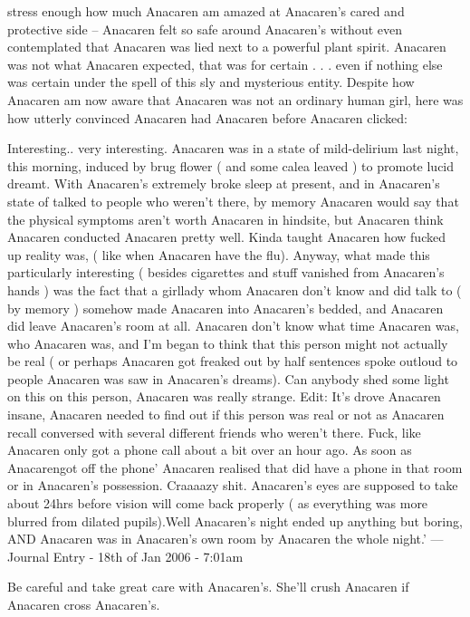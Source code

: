 \documentclass[12pt]{book}
\begin{document}
stress enough how much Anacaren am amazed at Anacaren's cared and protective side -- Anacaren felt so safe around Anacaren's without even contemplated that Anacaren was lied next to a powerful plant spirit. Anacaren was not what Anacaren expected, that was for certain . . .  even if nothing else was certain under the spell of this sly and mysterious entity. Despite how Anacaren am now aware that Anacaren was not an ordinary human girl, here was how utterly convinced Anacaren had Anacaren before Anacaren clicked: \begin{enumerate} Interesting.. very interesting. Anacaren was in a state of mild-delirium last night, this morning, induced by brug flower ( and some calea leaved ) to promote lucid dreamt. With Anacaren's extremely broke sleep at present, and in Anacaren's state of talked to people who weren't there, by memory Anacaren would say that the physical symptoms aren't worth Anacaren in hindsite, but Anacaren think Anacaren conducted Anacaren pretty well. Kinda taught Anacaren how fucked up reality was, ( like when Anacaren have the flu). Anyway, what made this particularly interesting ( besides cigarettes and stuff vanished from Anacaren's hands ) was the fact that a girllady whom Anacaren don't know and did talk to ( by memory ) somehow made Anacaren into Anacaren's bedded, and Anacaren did leave Anacaren's room at all. Anacaren don't know what time Anacaren was, who Anacaren was, and I'm began to think that this person might not actually be real ( or perhaps Anacaren got freaked out by half sentences spoke outloud to people Anacaren was saw in Anacaren's dreams). Can anybody shed some light on this on this person, Anacaren was really strange. Edit: It's drove Anacaren insane, Anacaren needed to find out if this person was real or not as Anacaren recall conversed with several different friends who weren't there. Fuck, like Anacaren only got a phone call about a bit over an hour ago. As soon as Anacarengot off the phone' Anacaren realised that did have a phone in that room or in Anacaren's possession. Craaaazy shit. Anacaren's eyes are supposed to take about 24hrs before vision will come back properly ( as everything was more blurred from dilated pupils).Well Anacaren's night ended up anything but boring, AND Anacaren was in Anacaren's own room by Anacaren the whole night.' --- Journal Entry - 18th of Jan 2006 - 7:01am \end{enumerate} Be careful and take great care with Anacaren's. She'll crush Anacaren if Anacaren cross Anacaren's.
\end{document}
